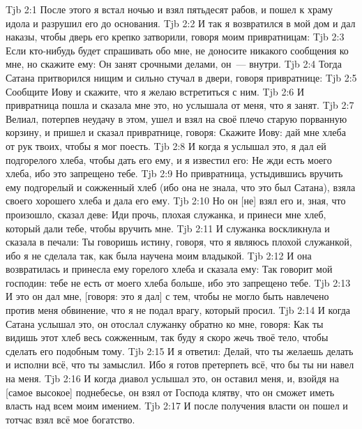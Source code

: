 \vs Tjb 2:1
После этого я встал ночью и взял пятьдесят рабов, и пошел к храму идола и разрушил его до основания.
\vs Tjb 2:2
И так я возвратился в мой дом и дал наказы, чтобы дверь его крепко затворили, говоря моим привратницам:
\vs Tjb 2:3
Если кто-нибудь будет спрашивать обо мне, не доносите никакого сообщения ко мне, но скажите ему: Он занят срочными делами, он~--- внутри.
\vs Tjb 2:4
Тогда Сатана притворился нищим и сильно стучал в двери, говоря привратнице:
\vs Tjb 2:5
Сообщите Иову и скажите, что я желаю встретиться с ним.
\vs Tjb 2:6
И привратница пошла и сказала мне это, но услышала от меня, что я занят.
\vs Tjb 2:7
Велиал, потерпев неудачу в этом, ушел и взял на своё плечо старую порванную корзину, и пришел и сказал привратнице, говоря: Скажите Иову: дай мне хлеба от рук твоих, чтобы я мог поесть.
\vs Tjb 2:8
И когда я услышал это, я дал ей подгорелого хлеба, чтобы дать его ему, и я известил его: Не жди есть моего хлеба, ибо это запрещено тебе.
\vs Tjb 2:9
Но привратница, устыдившись вручить ему подгорелый и сожженный хлеб (ибо она не знала, что это был Сатана), взяла своего хорошего хлеба и дала его ему.
\vs Tjb 2:10
Но он [не] взял его и, зная, что произошло, сказал деве: Иди прочь, плохая служанка, и принеси мне хлеб, который дали тебе, чтобы вручить мне.
\vs Tjb 2:11
И служанка воскликнула и сказала в печали: Ты говоришь истину, говоря, что я являюсь плохой служанкой, ибо я не сделала так, как была научена моим владыкой.
\vs Tjb 2:12
И она возвратилась и принесла ему горелого хлеба и сказала ему: Так говорит мой господин: тебе не есть от моего хлеба больше, ибо это запрещено тебе.
\vs Tjb 2:13
И это он дал мне, [говоря: это я дал] с тем, чтобы не могло быть навлечено против меня обвинение, что я не подал врагу, который просил.
\vs Tjb 2:14
И когда Сатана услышал это, он отослал служанку обратно ко мне, говоря: Как ты видишь этот хлеб весь сожженным, так буду я скоро жечь твоё тело, чтобы сделать его подобным тому.
\vs Tjb 2:15
И я ответил: Делай, что ты желаешь делать и исполни всё, что ты замыслил. Ибо я готов претерпеть всё, что бы ты ни навел на меня.
\vs Tjb 2:16
И когда диавол услышал это, он оставил меня, и, взойдя на [самое высокое] поднебесье, он взял от Господа клятву, что он сможет иметь власть над всем моим имением.
\vs Tjb 2:17
И после получения власти он пошел и тотчас взял всё мое богатство.

